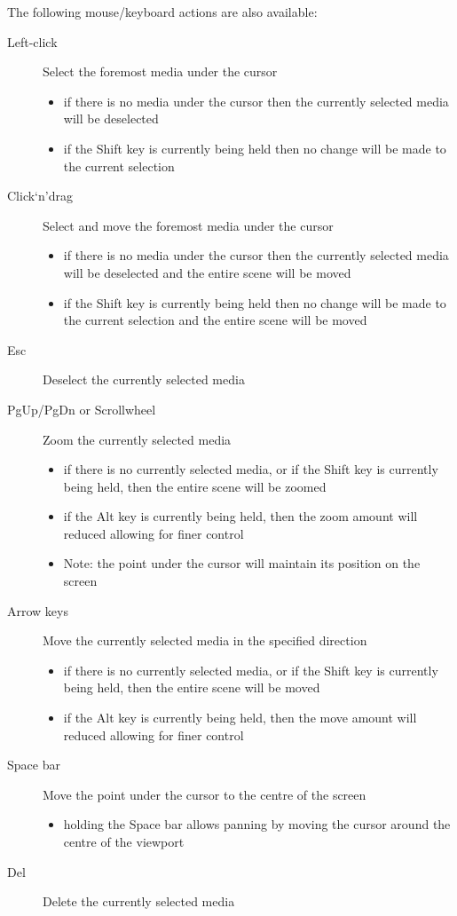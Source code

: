 \documentclass{report}
\begin{document}
  The following mouse/keyboard actions are also available:
  \begin{description}
    \item[Left-click] Select the foremost media under the cursor
    \begin{itemize}
      \item if there is no media under the cursor then the currently selected
            media will be deselected
      \item if the Shift key is currently being held then no change will be
            made to the current selection
    \end{itemize}
    \item[Click`n'drag] Select and move the foremost media under the cursor
    \begin{itemize}
      \item if there is no media under the cursor then the currently selected
            media will be deselected and the entire scene will be moved
      \item if the Shift key is currently being held then no change will be
            made to the current selection and the entire scene will be moved
    \end{itemize}
    \item[Esc] Deselect the currently selected media
    \item[PgUp/PgDn or Scrollwheel] Zoom the currently selected media
    \begin{itemize}
      \item if there is no currently selected media, or if the Shift key is
            currently being held, then the entire scene will be zoomed
      \item if the Alt key is currently being held, then the zoom amount will
            reduced allowing for finer control
      \item Note: the point under the cursor will maintain its position on the
            screen
    \end{itemize}
    \item[Arrow keys] Move the currently selected media in the specified
                      direction
    \begin{itemize}
      \item if there is no currently selected media, or if the Shift key is
            currently being held, then the entire scene will be moved
      \item if the Alt key is currently being held, then the move amount will
            reduced allowing for finer control
    \end{itemize}
    \item[Space bar] Move the point under the cursor to the centre of the
                     screen
    \begin{itemize}
      \item holding the Space bar allows panning by moving the cursor around
            the centre of the viewport
    \end{itemize}
    \item[Del] Delete the currently selected media
  \end{description}
\end{document}
